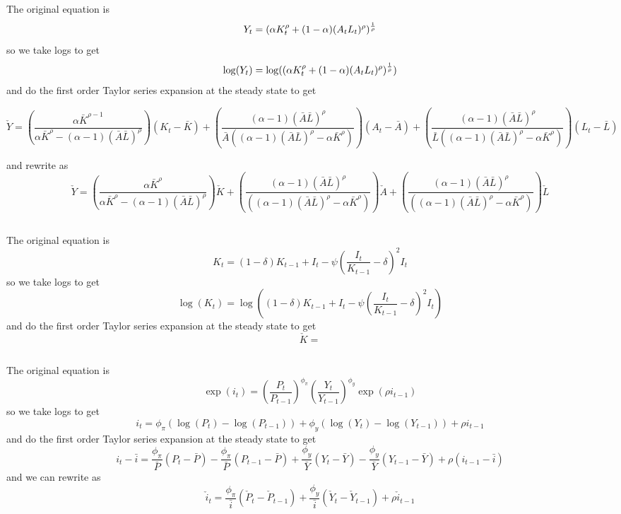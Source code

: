 \documentclass[11pt]{amsart}
\begin{document}
\subsection{}
The original equation is
\[
Y_t = (\alpha K_t^{\rho} + (1-\alpha)(A_t L_t)^{\rho})^{1 \over \rho}
\]
so we take logs to get
\[
\log(Y_t) = \log((\alpha K_t^{\rho} + (1-\alpha)(A_t L_t)^{\rho})^{1 \over \rho})
\]
and do the first order Taylor series expansion at the steady state to get
\begin{tiny}
\[
\check{Y}  = \left(\frac{\alpha  \bar{K}^{\rho -1}}{\alpha  \bar{K}^{\rho }-(\alpha -1) (\bar{A} \bar{L})^{\rho }}\right) (K_t - \bar{K}) + \left(\frac{(\alpha -1) (\bar{A} \bar{L})^{\rho }}{\bar{A} \left((\alpha -1) (\bar{A} \bar{L})^{\rho }-\alpha  \bar{K}^{\rho }\right)}\right) (A_t - \bar{A}) + \left(\frac{(\alpha -1) (\bar{A} \bar{L})^{\rho }}{\bar{L} \left((\alpha -1) (\bar{A} \bar{L})^{\rho }-\alpha  \bar{K}^{\rho }\right)}\right)(L_t - \bar{L})
\]
\end{tiny}
and rewrite as
\[
\check{Y}  = \left(\frac{\alpha  \bar{K}^{\rho}}{\alpha  \bar{K}^{\rho }-(\alpha -1) (\bar{A} \bar{L})^{\rho }}\right) \check{K} + \left(\frac{(\alpha -1) (\bar{A} \bar{L})^{\rho }}{\left((\alpha -1) (\bar{A} \bar{L})^{\rho }-\alpha  \bar{K}^{\rho }\right)}\right) \check{A} + \left(\frac{(\alpha -1) (\bar{A} \bar{L})^{\rho }}{\left((\alpha -1) (\bar{A} \bar{L})^{\rho }-\alpha  \bar{K}^{\rho }\right)}\right) \check{L}
\]


\subsection{}
The original equation is
\[
K_t = (1-\delta) K_{t-1} + I_t - \psi \left(\frac{I_t}{K_{t-1}} - \delta \right)^2 I_t
\]
so we take logs to get
\[
\log(K_t) = \log((1-\delta) K_{t-1} + I_t - \psi \left(\frac{I_t}{K_{t-1}} - \delta \right)^2 I_t)
\]
and do the first order Taylor series expansion at the steady state to get
\[
\check{K} = 
\]

\subsection{}

\subsection{}
The original equation is
\[
\exp(i_t) = \left(\frac{P_t}{P_{t-1}} \right)^{\phi_{\pi}} \left(\frac{Y_t}{Y_{t-1}} \right)^{\phi_y} \exp(\rho i_{t-1})
\]
so we take logs to get
\[
i_t = \phi_{\pi}(\log(P_t) - \log(P_{t-1})) + \phi_y (\log(Y_t) - \log(Y_{t-1})) + \rho i_{t-1}
\]
and do the first order Taylor series expansion at the steady state to get
\[
i_t - \bar{i} = \frac{\phi_{\pi}}{\bar{P}} (P_t - \bar{P}) - \frac{\phi_{\pi}}{\bar{P}} (P_{t-1} - \bar{P}) +\frac{\phi_y}{\bar{Y}} (Y_t - \bar{Y}) - \frac{\phi_y}{\bar{Y}} (Y_{t-1} - \bar{Y}) + \rho(i_{t-1} - \bar{i})
\]
and we can rewrite as
\[
\check{i}_t = \frac{\phi_{\pi}}{\bar{i}} (\check{P}_t - \check{P}_{t-1})  +\frac{\phi_y}{\bar{i}} (\check{Y}_t - \check{Y}_{t-1}) + \rho \check{i}_{t-1}
\]
\end{document}
